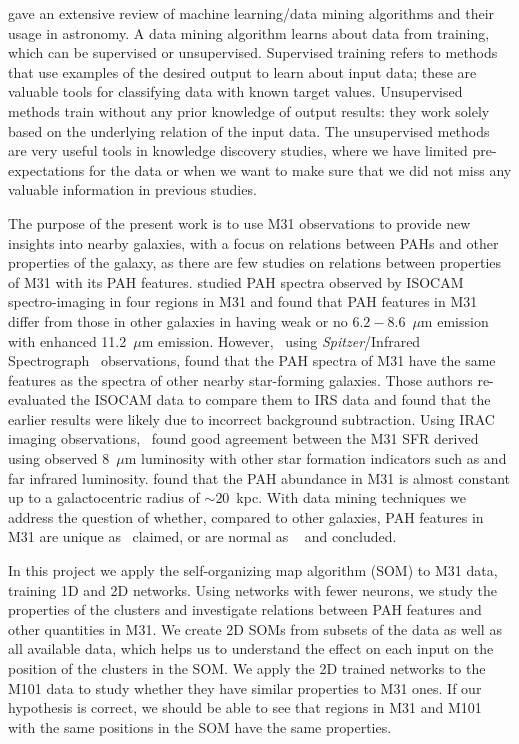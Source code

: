 \cite{Ball10} gave an extensive review of machine learning/data mining algorithms and their usage in astronomy.
A data mining algorithm learns about data from training, which can be supervised or unsupervised.
Supervised training refers to methods that use examples of the desired output to learn about input data; these are valuable tools for classifying data with known target values.
Unsupervised methods train without any prior knowledge of output results: 
they work solely based on the underlying relation of the input data.   
The unsupervised methods are very useful tools in knowledge discovery studies, where we have limited pre-expectations for the data or when we want to make sure that we did not miss any valuable information in previous studies.

The purpose of the present work is to use M31 observations to provide new insights into nearby galaxies, with a focus on relations between PAHs and other properties of the galaxy,
as there are few studies on relations between properties of M31 with its PAH features.
\cite{Cesarsky98} studied PAH spectra observed by ISOCAM spectro-imaging in four regions in M31 and found that PAH features in M31 differ from those in other galaxies in having weak or no $6.2 - 8.6$~$\mu$m emission with enhanced 11.2~$\mu$m emission. 
However,~\cite{Dim15} using {\it Spitzer}/Infrared Spectrograph~\citep[IRS;][]{Houck04b} observations, found that the PAH spectra of M31 have the same features as the spectra of other nearby star-forming galaxies.
Those authors re-evaluated the ISOCAM data to compare them to IRS data and found that the earlier results were likely due to incorrect background subtraction.
Using IRAC imaging observations,~\cite{Barmby06} found good agreement between the M31 SFR derived using observed 8~$\mu$m luminosity with other 
star formation indicators such as \halpha and far infrared luminosity.
\cite{Draine14} found that the PAH abundance in M31 is almost constant up to a galactocentric radius of $\sim 20$~kpc.
With data mining techniques we address the question of whether,
compared to other galaxies, PAH features in M31 are unique as~\cite{Cesarsky98} claimed, or  are normal as ~\cite{Dim15} and \cite{Draine14} concluded.


In this project we apply the self-organizing map algorithm (SOM) to M31 data, training 1D and 2D networks.
Using networks with fewer neurons, we study the properties of the clusters and investigate relations between PAH features and other quantities in M31.
We create 2D SOMs from subsets of the data as well as all available data, which helps us to understand the effect on each input on the position of the clusters in the SOM.
We apply the 2D trained networks to the M101 data to study whether they have similar properties to M31 ones.
If our hypothesis is correct, we should be able to see that regions in M31 and M101 with the same positions in the SOM have the same properties.


